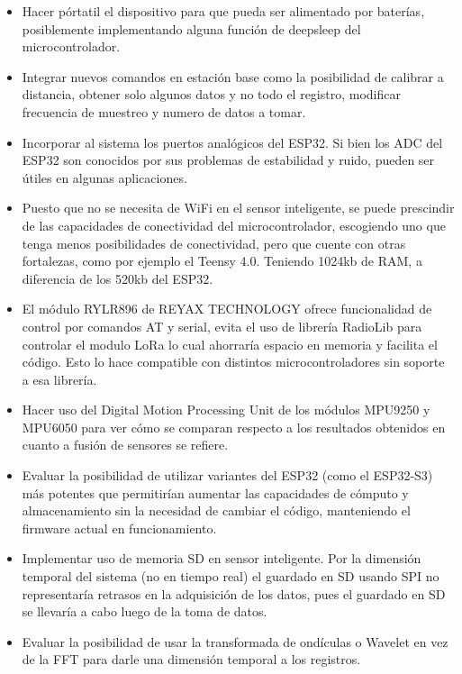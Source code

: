 \begin{itemize}
 \item Hacer pórtatil el dispositivo para que pueda ser alimentado por baterías, posiblemente implementando alguna función de deepsleep del microcontrolador.
 
 \item Integrar nuevos comandos en estación base como la posibilidad de calibrar a distancia, obtener solo algunos datos y no todo el registro, modificar frecuencia de muestreo y numero de datos a tomar.
 
 \item Incorporar al sistema los puertos analógicos del ESP32. Si bien los ADC del ESP32 son conocidos por sus problemas de estabilidad y ruido, pueden ser útiles en algunas aplicaciones. 
 
 \item Puesto que no se necesita de WiFi en el sensor inteligente, se puede prescindir de las capacidades de conectividad del microcontrolador, escogiendo uno que tenga menos posibilidades de conectividad, pero que cuente con otras fortalezas, como por ejemplo el Teensy 4.0. Teniendo 1024kb de RAM, a diferencia de los 520kb del ESP32.
 
 \item El módulo RYLR896 de REYAX TECHNOLOGY ofrece funcionalidad de control por comandos AT y serial, evita el uso de librería RadioLib para controlar el modulo LoRa lo cual ahorraría espacio en memoria y facilita el código. Esto lo hace compatible con distintos microcontroladores sin soporte a esa librería.
 
 \item Hacer uso del Digital Motion Processing Unit de los módulos MPU9250 y MPU6050 para ver cómo se comparan respecto a los resultados obtenidos en cuanto a fusión de sensores se refiere.
 
 \item  Evaluar la posibilidad de utilizar variantes del ESP32 (como el ESP32-S3) más potentes que permitirían aumentar las capacidades de cómputo y almacenamiento sin la necesidad de cambiar el código, manteniendo el firmware actual en funcionamiento.
 
 \item Implementar uso de memoria SD en sensor inteligente. Por la dimensión temporal del sistema (no en tiempo real) el guardado en SD usando SPI no representaría retrasos en la adquisición de los datos, pues el guardado en SD se llevaría a cabo luego de la toma de datos.
 
 \item Evaluar la posibilidad de usar la transformada de ondículas o Wavelet en vez de la FFT para darle una dimensión temporal a los registros.
 

\end{itemize}
